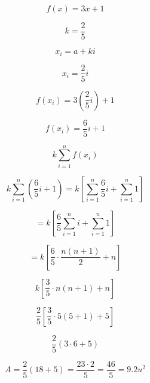 \[
f(x) = 3x + 1
\]

\[
k = \frac{2}{5}
\]

\[
x_i = a + k i
\]

\[
x_i = \frac{2}{5} i
\]

\[
f(x_i) = 3 \left(\frac{2}{5} i \right) + 1
\]

\[
f(x_i) = \frac{6}{5} i + 1
\]


\[
k \sum_{i=1}^{n} f(x_i)
\]

\[
k \sum_{i=1}^{n} \left( \frac{6}{5} i + 1 \right) = k \left[ \sum_{i=1}^{n} \frac{6}{5} i + \sum_{i=1}^{n} 1 \right]
\]

\[
= k \left[ \frac{6}{5} \sum_{i=1}^{n} i + \sum_{i=1}^{n} 1 \right]
\]

\[
= k \left[ \frac{6}{5} \cdot \frac{n(n+1)}{2} + n \right]
\]

\[
k \left[ \frac{3}{5} \cdot n(n+1) + n \right]
\]

\[
\frac{2}{5} \left[ \frac{3}{5} \cdot 5(5+1) + 5 \right]
\]

\[
\frac{2}{5} \left( 3 \cdot 6 + 5 \right)
\]

\[
A = \frac{2}{5} (18 + 5) = \frac{23 \cdot 2}{5} = \frac{46}{5} = 9.2 u^2
\]